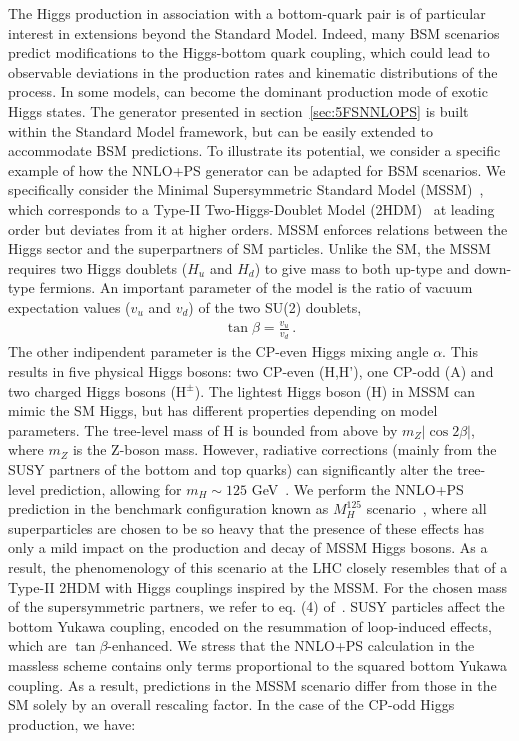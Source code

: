 \documentclass[11pt,a4paper]{article}
\begin{document}
The Higgs production in association with a bottom-quark pair is of particular interest in extensions beyond the Standard Model. Indeed, many BSM scenarios predict modifications to the Higgs-bottom quark coupling, which could lead to observable deviations in the production rates and kinematic distributions of the \bbH{} process. In some models, \bbH{} can become the dominant production mode of exotic Higgs states. The \minnlo{} generator presented in section~\ref{sec:5FSNNLOPS} is built within the Standard Model framework, but can be easily extended to accommodate BSM predictions. To illustrate its potential, we consider a specific example of how the NNLO+PS generator can be adapted for BSM scenarios. We specifically consider the Minimal Supersymmetric Standard Model (MSSM)~\cite{Ovrut:1984uc,Haber:1984rc,Gunion:1984yn}, which corresponds to a Type-II Two-Higgs-Doublet Model (2HDM)~\cite{Branco:2011iw} at leading order but deviates from it at higher orders. MSSM enforces relations between the Higgs sector and the superpartners of SM particles. Unlike the SM, the MSSM requires two Higgs doublets ($H_u$ and $H_d$) to give mass to both up-type and down-type fermions. An important parameter of the model is the ratio of vacuum expectation values ($v_u$ and $v_d$) of the two SU(2) doublets,
\begin{align}
	\tan\beta=\frac{v_u}{v_d}\,.
\end{align}
The other indipendent parameter is the CP-even Higgs mixing angle $\alpha$. This results in five physical Higgs bosons: two CP-even (H,H'), one CP-odd (A) and two charged Higgs bosons ($\text{H}^{\pm}$). The lightest Higgs boson ($\text{H}$) in MSSM can mimic the SM Higgs, but has different properties depending on model parameters. The tree-level mass of $\text{H}$ is bounded from above by $m_Z |\cos 2\beta|$, where $m_Z$ is the Z-boson mass. However, radiative corrections (mainly from the SUSY partners of the bottom and top quarks) can significantly alter the tree-level prediction, allowing for $m_H\sim 125$ GeV~\cite{Heinemeyer:2011aa,Bechtle:2012jw,Draper:2016pys,Bechtle:2016kui,Haber:2017erd}. We perform the NNLO+PS prediction in the benchmark configuration known as $M_H^{125}$ scenario~\cite{Bagnaschi:2018ofa}, where all superparticles are chosen to be so heavy that the presence of these effects has only a mild impact on the production and decay of MSSM Higgs bosons. As a result, the phenomenology of this scenario at the LHC closely resembles that of a Type-II 2HDM with Higgs couplings inspired by the MSSM. For the chosen mass of the supersymmetric partners, we refer to eq. (4) of~. SUSY particles affect the bottom Yukawa coupling, encoded on the resummation of loop-induced effects, which are $\tan\beta$-enhanced. We stress that the NNLO+PS calculation in the massless scheme contains only terms proportional to the squared bottom Yukawa coupling. As a result, predictions in the MSSM scenario differ from those in the SM solely by an overall rescaling factor. In the case of the CP-odd Higgs production, we have:
\end{document}
